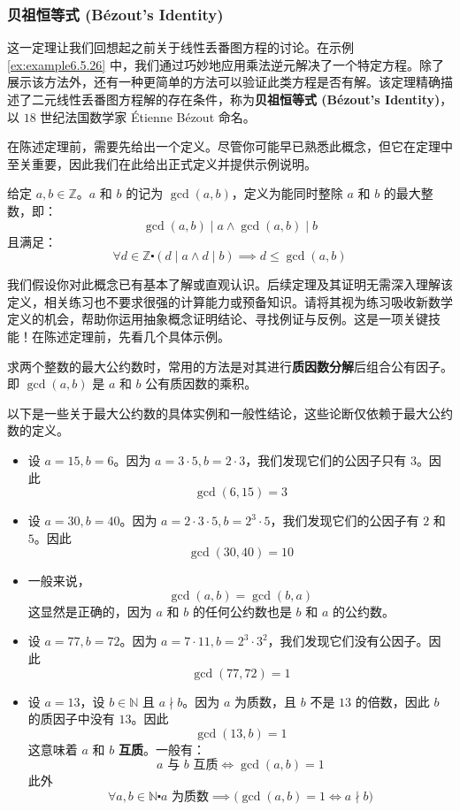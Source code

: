 \subsubsection*{贝祖恒等式 (Bézout's Identity)}

这一定理让我们回想起之前关于线性丢番图方程的讨论。在示例 \ref{ex:example6.5.26} 中，我们通过巧妙地应用乘法逆元解决了一个特定方程。除了展示该方法外，还有一种更简单的方法可以验证此类方程是否有解。该定理精确描述了二元线性丢番图方程解的存在条件，称为\textbf{贝祖恒等式 (Bézout's Identity)}，以 $18$ 世纪法国数学家 Étienne Bézout 命名。

在陈述定理前，需要先给出一个定义。尽管你可能早已熟悉此概念，但它在定理中至关重要，因此我们在此给出正式定义并提供示例说明。

\begin{definition}[最大公约数]\label{def:definition6.5.29}
    给定 $a,b \in \mathbb{Z}$。$a$ 和 $b$ 的记为 $\gcd(a, b)$，定义为能同时整除 $a$ 和 $b$ 的最大整数，即：
    \[\gcd(a, b) \mid a \land \gcd(a, b) \mid b\]
    且满足：
    \[\forall d \in \mathbb{Z} \centerdot (d \mid a \land d \mid b) \implies d \le \gcd(a, b)\]
\end{definition}

我们假设你对此概念已有基本了解或直观认识。后续定理及其证明无需深入理解该定义，相关练习也不要求很强的计算能力或预备知识。请将其视为练习吸收新数学定义的机会，帮助你运用抽象概念证明结论、寻找例证与反例。这是一项关键技能！在陈述定理前，先看几个具体示例。

\begin{example}
    求两个整数的最大公约数时，常用的方法是对其进行\textbf{质因数分解}后组合公有因子。即 $\gcd(a, b)$ 是 $a$ 和 $b$ 公有质因数的乘积。

    以下是一些关于最大公约数的具体实例和一般性结论，这些论断仅依赖于最大公约数的定义。

    \begin{itemize}
        \item 设 $a=15, b=6$。因为 $a = 3 \cdot 5, b = 2 \cdot 3$，我们发现它们的公因子只有 $3$。因此
            \[\gcd(6, 15) = 3\]
        \item 设 $a=30, b=40$。因为 $a = 2 \cdot 3 \cdot 5, b = 2^3 \cdot 5$，我们发现它们的公因子有 $2$ 和 $5$。因此
            \[\gcd(30, 40) = 10\]
        \item 一般来说，
            \[\gcd(a, b) = \gcd(b, a)\]
            这显然是正确的，因为 $a$ 和 $b$ 的任何公约数也是 $b$ 和 $a$ 的公约数。
        \item 设 $a=77, b=72$。因为 $a = 7 \cdot 11, b = 2^3 \cdot 3^2$，我们发现它们没有公因子。因此
            \[\gcd(77, 72) = 1\]
        \item 设 $a=13$，设 $b \in \mathbb{N}$ 且 $a \nmid b$。因为 $a$ 为质数，且 $b$ 不是 $13$ 的倍数，因此 $b$ 的质因子中没有 $13$。因此
            \[\gcd(13, b) = 1\]
            这意味着 $a$ 和 $b$ \textbf{互质}。一般有：
            \[a \text{\ 与\ } b \text{\ 互质} \iff \gcd(a, b) = 1\]
            此外
            \[\forall a, b \in \mathbb{N} \centerdot a \text{\ 为质数} \implies \big(\gcd(a,b)=1 \iff a \nmid b\big)\]
    \end{itemize}
\end{example}

